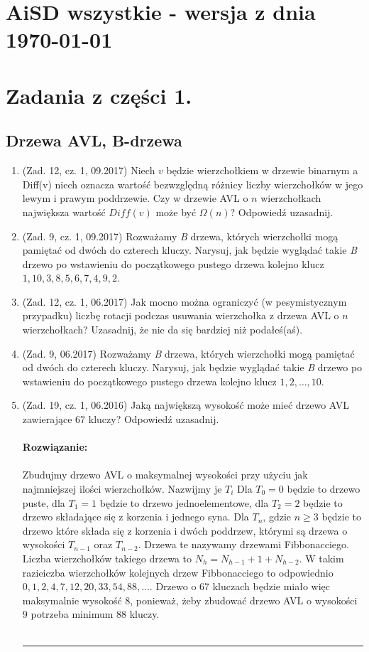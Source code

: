 \documentclass[10pt]{article}%
\newcommand{\beginsolution}{\textbf{\\~\\ \textbf{Rozwiązanie:} \\~\\}}
\newcommand{\finishsolution}{\\~\\ \noindent\rule{11cm}{0.4pt}}
\begin{document}
\section*{AiSD wszystkie - wersja z dnia \today}

\tableofcontents

\section{Zadania z części 1.}


\subsection{Drzewa AVL, B-drzewa}

\begin{enumerate}

\item (Zad. 12, cz. 1, 09.2017) Niech $v$ będzie wierzchołkiem w drzewie binarnym a Diff(v) niech oznacza wartość bezwzględną różnicy liczby wierzchołków  w jego lewym i prawym poddrzewie. Czy w drzewie AVL o $n$ wierzchołkach największa wartość $Diff(v)$ może być $\Omega(n)$? Odpowiedź uzasadnij.

\item (Zad. 9, cz. 1, 09.2017) Rozważamy \emph{B} drzewa, których wierzchołki mogą pamiętać od dwóch do czterech kluczy. Narysuj, jak będzie wyglądać takie \emph{B} drzewo po wstawieniu do początkowego pustego drzewa kolejno klucz $1, 10, 3, 8, 5, 6, 7, 4, 9, 2$.

\item (Zad. 12, cz. 1, 06.2017) Jak mocno można ograniczyć (w pesymistycznym przypadku) liczbę rotacji podczas usuwania wierzchołka z drzewa AVL o $n$ wierzchołkach? Uzasadnij, że nie da się bardziej niż podałeś(aś).

\item (Zad. 9, 06.2017) Rozważamy \emph{B} drzewa, których wierzchołki mogą pamiętać od dwóch do czterech kluczy. Narysuj, jak będzie wyglądać takie \emph{B} drzewo po wstawieniu do początkowego pustego drzewa kolejno klucz $1,2,\ldots,10$.

\item (Zad. 19, cz. 1, 06.2016) Jaką największą wysokość może mieć drzewo AVL zawierające 67 kluczy? Odpowiedź uzasadnij.
\beginsolution
Zbudujmy drzewo AVL o maksymalnej wysokości przy użyciu jak najmniejszej ilości wierzchołków. Nazwijmy je $T_i$ Dla $T_0 = 0$ będzie to drzewo puste, dla $T_1 = 1$ będzie to drzewo jednoelementowe, dla $T_2 = 2$ będzie to drzewo składające się z korzenia i jednego syna. Dla $T_n$, gdzie $n \geq 3$ będzie to drzewo które składa się z korzenia i dwóch poddrzew, którymi są drzewa o wysokości $T_{n-1}$ oraz $T_{n-2}$. Drzewa te nazywamy drzewami Fibbonacciego. Liczba wierzchołków takiego drzewa to $N_h = N_{h-1} + 1 + N_{h-2}$. W takim razieiczba wierzchołków kolejnych drzew Fibbonacciego to odpowiednio $0, 1, 2, 4, 7, 12, 20, 33, 54, 88, \ldots $. Drzewo o 67 kluczach będzie miało więc maksymalnie wysokość 8, ponieważ, żeby zbudować drzewo AVL o wysokości $9$ potrzeba minimum 88 kluczy. 
\finishsolution


\end{enumerate}
\end{document}
